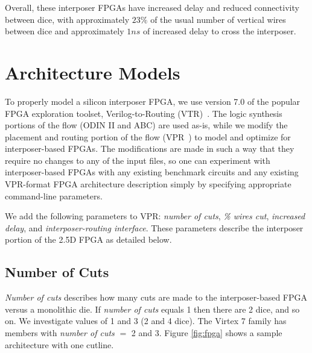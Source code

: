 \documentclass[journal]{IEEEtran}
\begin{document}
Overall, these interposer FPGAs have increased delay and reduced connectivity between dice, with approximately $23\%$ of the usual number of vertical wires between dice and approximately $1ns$ of increased delay to cross the interposer.

\section{Architecture Models}
\label{archSection}
To properly model a silicon interposer FPGA, we use version 7.0 of the popular FPGA exploration toolset, Verilog-to-Routing (VTR)~\cite{luu2014vtr}. The logic synthesis portions of the flow (ODIN II and  ABC) are used as-is, while we modify the placement and routing portion of the flow (VPR~\cite{betz1997vpr}) to model and optimize for interposer-based FPGAs. The modifications are made in such a way that they require no changes to any of the input files, so one can experiment with interposer-based FPGAs with any existing benchmark circuits and any existing VPR-format FPGA architecture description simply by specifying appropriate command-line parameters.

We add the following parameters to VPR: \textit{number of cuts}, \textit{\% wires cut}, \textit{increased delay}, and \textit{interposer-routing interface}. These parameters describe the interposer portion of the 2.5D FPGA as detailed below.

\subsection{Number of Cuts}
\textit{Number of cuts} describes how many cuts are made to the interposer-based FPGA versus a monolithic die. If \textit{number of cuts} equals 1 then there are 2 dice, and so on. We investigate values of 1 and 3 (2 and 4 dice). The Virtex 7 family has members with \textit{number of cuts} $=$ 2 and 3. Figure \ref{fig:fpga} shows a sample architecture with one cutline.
\end{document}
